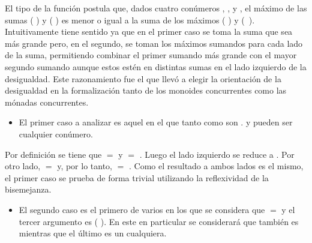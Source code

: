 \begin{AgdaAlign}
El tipo de la función  postula que, dados cuatro conúmeros , ,  y , el máximo de las sumas ( \AgdaFunction{+} ) y ( \AgdaFunction{+} ) es menor o igual a la suma de los máximos (  ) y \hbox{(  )}. Intuitivamente tiene sentido ya que en el primer caso se toma la suma que sea más grande pero, en el segundo, se toman los máximos sumandos para cada lado de la suma, permitiendo combinar el primer sumando más grande con el mayor segundo sumando aunque estos estén en distintas sumas en el lado izquierdo de la desigualdad. Este razonamiento fue el que llevó a elegir la orientación de la desigualdad en la formalización tanto de los monoides concurrentes como las mónadas concurrentes. 

\begin{itemize}
\item El primer caso a analizar es aquel en el que tanto  como 
 son .  y  pueden ser cualquier conúmero.
\end{itemize}

Por definición se tiene que  \AgdaFunction{+}  $=$  y  \AgdaFunction{+}  $=$ . Luego el lado izquierdo se reduce a   . Por otro lado,    $=$  y, por lo tanto,    \AgdaFunction{+}   $=$  . Como el resultado a ambos lados es el mismo, el primer caso se prueba de forma trivial utilizando la reflexividad de la bisemejanza.

\begin{itemize}
\item El segundo caso es el primero de varios en los que se considera que  $=$  y el tercer argumento es ( ). En este en particular se considerará que  también es  mientras que el último es un  cualquiera. 
\end{itemize}


\end{AgdaAlign}

